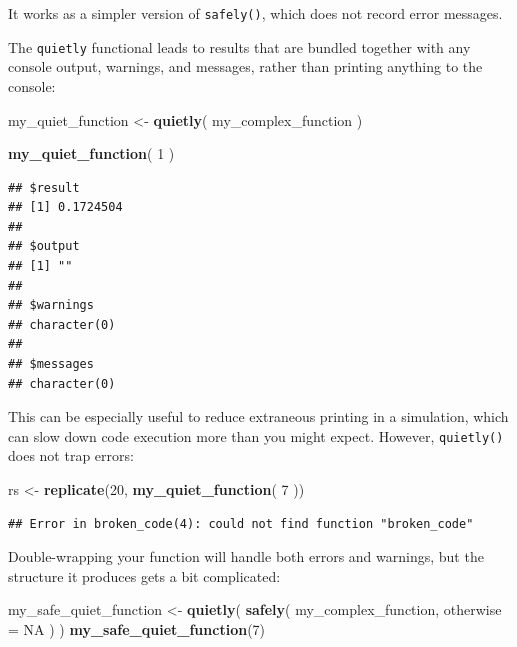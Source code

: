 \documentclass[
]{book}
\newenvironment{Shaded}{\begin{snugshade}}{\end{snugshade}}
\newcommand{\AttributeTok}[1]{\textcolor[rgb]{0.13,0.29,0.53}{#1}}
\newcommand{\ConstantTok}[1]{\textcolor[rgb]{0.56,0.35,0.01}{#1}}
\newcommand{\DecValTok}[1]{\textcolor[rgb]{0.00,0.00,0.81}{#1}}
\newcommand{\FunctionTok}[1]{\textcolor[rgb]{0.13,0.29,0.53}{\textbf{#1}}}
\newcommand{\NormalTok}[1]{#1}
\newcommand{\OtherTok}[1]{\textcolor[rgb]{0.56,0.35,0.01}{#1}}
\begin{document}
It works as a simpler version of \texttt{safely()}, which does not record error messages.

The \texttt{quietly} functional leads to results that are bundled together with any console output, warnings, and messages, rather than printing anything to the console:

\begin{Shaded}
\begin{Highlighting}[]
\NormalTok{my\_quiet\_function }\OtherTok{\textless{}{-}} \FunctionTok{quietly}\NormalTok{( my\_complex\_function )}

\FunctionTok{my\_quiet\_function}\NormalTok{( }\DecValTok{1}\NormalTok{ )}
\end{Highlighting}
\end{Shaded}

\begin{verbatim}
## $result
## [1] 0.1724504
## 
## $output
## [1] ""
## 
## $warnings
## character(0)
## 
## $messages
## character(0)
\end{verbatim}

This can be especially useful to reduce extraneous printing in a simulation, which can slow down code execution more than you might expect.
However, \texttt{quietly()} does not trap errors:

\begin{Shaded}
\begin{Highlighting}[]
\NormalTok{rs }\OtherTok{\textless{}{-}} \FunctionTok{replicate}\NormalTok{(}\DecValTok{20}\NormalTok{, }\FunctionTok{my\_quiet\_function}\NormalTok{( }\DecValTok{7}\NormalTok{ ))}
\end{Highlighting}
\end{Shaded}

\begin{verbatim}
## Error in broken_code(4): could not find function "broken_code"
\end{verbatim}

Double-wrapping your function will handle both errors and warnings, but the structure it produces gets a bit complicated:

\begin{Shaded}
\begin{Highlighting}[]
\NormalTok{my\_safe\_quiet\_function }\OtherTok{\textless{}{-}} \FunctionTok{quietly}\NormalTok{( }\FunctionTok{safely}\NormalTok{( my\_complex\_function, }\AttributeTok{otherwise =} \ConstantTok{NA}\NormalTok{ ) )}
\FunctionTok{my\_safe\_quiet\_function}\NormalTok{(}\DecValTok{7}\NormalTok{)}
\end{Highlighting}
\end{Shaded}
\end{document}
